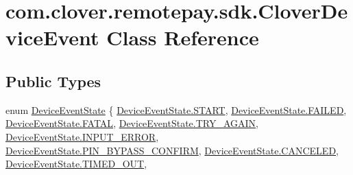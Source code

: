 \hypertarget{classcom_1_1clover_1_1remotepay_1_1sdk_1_1_clover_device_event}{}\section{com.\+clover.\+remotepay.\+sdk.\+Clover\+Device\+Event Class Reference}
\label{classcom_1_1clover_1_1remotepay_1_1sdk_1_1_clover_device_event}
\subsection*{Public Types}
\begin{DoxyCompactItemize}
\item 
enum \hyperlink{classcom_1_1clover_1_1remotepay_1_1sdk_1_1_clover_device_event_a1c3d109490aaab4a0b8f40ceb990abe3}{Device\+Event\+State} \{ \newline
\hyperlink{classcom_1_1clover_1_1remotepay_1_1sdk_1_1_clover_device_event_a1c3d109490aaab4a0b8f40ceb990abe3ab078ffd28db767c502ac367053f6e0ac}{Device\+Event\+State.\+S\+T\+A\+RT}, 
\hyperlink{classcom_1_1clover_1_1remotepay_1_1sdk_1_1_clover_device_event_a1c3d109490aaab4a0b8f40ceb990abe3ab9e14d9b2886bcff408b85aefa780419}{Device\+Event\+State.\+F\+A\+I\+L\+ED}, 
\hyperlink{classcom_1_1clover_1_1remotepay_1_1sdk_1_1_clover_device_event_a1c3d109490aaab4a0b8f40ceb990abe3a19da7170bea36556dde582519795f3fc}{Device\+Event\+State.\+F\+A\+T\+AL}, 
\hyperlink{classcom_1_1clover_1_1remotepay_1_1sdk_1_1_clover_device_event_a1c3d109490aaab4a0b8f40ceb990abe3a7f873066b6a00fc1bc728c3063bec9eb}{Device\+Event\+State.\+T\+R\+Y\+\_\+\+A\+G\+A\+IN}, 
\newline
\hyperlink{classcom_1_1clover_1_1remotepay_1_1sdk_1_1_clover_device_event_a1c3d109490aaab4a0b8f40ceb990abe3ad307c747dc4b0d01887e1708287a1248}{Device\+Event\+State.\+I\+N\+P\+U\+T\+\_\+\+E\+R\+R\+OR}, 
\hyperlink{classcom_1_1clover_1_1remotepay_1_1sdk_1_1_clover_device_event_a1c3d109490aaab4a0b8f40ceb990abe3aecf2b44d8d7123e7b1de16ce792b6dce}{Device\+Event\+State.\+P\+I\+N\+\_\+\+B\+Y\+P\+A\+S\+S\+\_\+\+C\+O\+N\+F\+I\+RM}, 
\hyperlink{classcom_1_1clover_1_1remotepay_1_1sdk_1_1_clover_device_event_a1c3d109490aaab4a0b8f40ceb990abe3ad4539bffb6062bdcbd7e7cc1b1228926}{Device\+Event\+State.\+C\+A\+N\+C\+E\+L\+ED}, 
\hyperlink{classcom_1_1clover_1_1remotepay_1_1sdk_1_1_clover_device_event_a1c3d109490aaab4a0b8f40ceb990abe3adbe2cbac46ffa8283747010d8e1e6396}{Device\+Event\+State.\+T\+I\+M\+E\+D\+\_\+\+O\+UT}, 
\newline

\end{DoxyCompactItemize}

